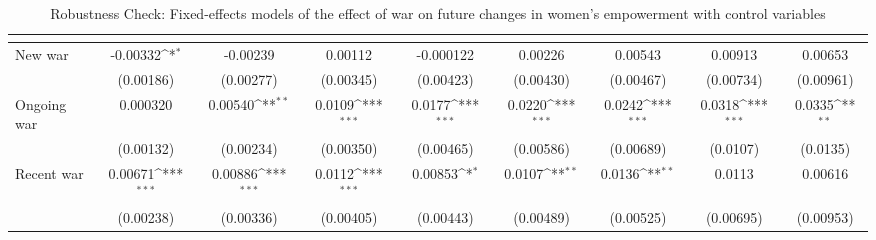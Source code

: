 \begin{table}[htbp]\centering
\def\sym#1{\ifmmode^{#1}\else\(^{#1}\)\fi}
\caption{Robustness Check: Fixed-effects models of the effect of war on future changes in women's empowerment with control variables\label{polemprobustwocontros}}
\begin{tabular}{l*{8}{c}}
\hline\hline
                    &&&&&&&&\\
\hline
New war               &    -0.00332\sym{*}  &    -0.00239         &     0.00112         &   -0.000122         &     0.00226         &     0.00543         &     0.00913         &     0.00653         \\
                    &   (0.00186)         &   (0.00277)         &   (0.00345)         &   (0.00423)         &   (0.00430)         &   (0.00467)         &   (0.00734)         &   (0.00961)         \\
[1em]
Ongoing war           &    0.000320         &     0.00540\sym{**} &      0.0109\sym{***}&      0.0177\sym{***}&      0.0220\sym{***}&      0.0242\sym{***}&      0.0318\sym{***}&      0.0335\sym{**} \\
                    &   (0.00132)         &   (0.00234)         &   (0.00350)         &   (0.00465)         &   (0.00586)         &   (0.00689)         &    (0.0107)         &    (0.0135)         \\
[1em]
Recent war           &     0.00671\sym{***}&     0.00886\sym{***}&      0.0112\sym{***}&     0.00853\sym{*}  &      0.0107\sym{**} &      0.0136\sym{**} &      0.0113         &     0.00616         \\
                    &   (0.00238)         &   (0.00336)         &   (0.00405)         &   (0.00443)         &   (0.00489)         &   (0.00525)         &   (0.00695)         &   (0.00953)         \\

\end{tabular}
\end{table}

